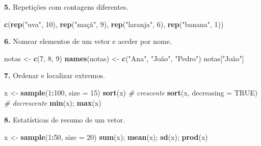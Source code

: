\documentclass[
  portuguese,
  11pt,
  openany]{book}
\newenvironment{Shaded}{\begin{snugshade}}{\end{snugshade}}
\newcommand{\AttributeTok}[1]{\textcolor[rgb]{0.13,0.29,0.53}{#1}}
\newcommand{\CommentTok}[1]{\textcolor[rgb]{0.56,0.35,0.01}{\textit{#1}}}
\newcommand{\ConstantTok}[1]{\textcolor[rgb]{0.56,0.35,0.01}{#1}}
\newcommand{\DecValTok}[1]{\textcolor[rgb]{0.00,0.00,0.81}{#1}}
\newcommand{\FunctionTok}[1]{\textcolor[rgb]{0.13,0.29,0.53}{\textbf{#1}}}
\newcommand{\NormalTok}[1]{#1}
\newcommand{\OtherTok}[1]{\textcolor[rgb]{0.56,0.35,0.01}{#1}}
\newcommand{\SpecialCharTok}[1]{\textcolor[rgb]{0.81,0.36,0.00}{\textbf{#1}}}
\newcommand{\StringTok}[1]{\textcolor[rgb]{0.31,0.60,0.02}{#1}}
\begin{document}
\textbf{5.} Repetições com contagens diferentes.

\begin{Shaded}
\begin{Highlighting}[]
\FunctionTok{c}\NormalTok{(}\FunctionTok{rep}\NormalTok{(}\StringTok{"uva"}\NormalTok{, }\DecValTok{10}\NormalTok{), }\FunctionTok{rep}\NormalTok{(}\StringTok{"maçã"}\NormalTok{, }\DecValTok{9}\NormalTok{), }\FunctionTok{rep}\NormalTok{(}\StringTok{"laranja"}\NormalTok{, }\DecValTok{6}\NormalTok{), }\FunctionTok{rep}\NormalTok{(}\StringTok{"banana"}\NormalTok{, }\DecValTok{1}\NormalTok{))}
\end{Highlighting}
\end{Shaded}

\textbf{6.} Nomear elementos de um vetor e aceder por nome.

\begin{Shaded}
\begin{Highlighting}[]
\NormalTok{notas }\OtherTok{\textless{}{-}} \FunctionTok{c}\NormalTok{(}\DecValTok{7}\NormalTok{, }\DecValTok{8}\NormalTok{, }\DecValTok{9}\NormalTok{)}
\FunctionTok{names}\NormalTok{(notas) }\OtherTok{\textless{}{-}} \FunctionTok{c}\NormalTok{(}\StringTok{"Ana"}\NormalTok{, }\StringTok{"João"}\NormalTok{, }\StringTok{"Pedro"}\NormalTok{)}
\NormalTok{notas[}\StringTok{"João"}\NormalTok{]}
\end{Highlighting}
\end{Shaded}

\textbf{7.} Ordenar e localizar extremos.

\begin{Shaded}
\begin{Highlighting}[]
\NormalTok{x }\OtherTok{\textless{}{-}} \FunctionTok{sample}\NormalTok{(}\DecValTok{1}\SpecialCharTok{:}\DecValTok{100}\NormalTok{, }\AttributeTok{size =} \DecValTok{15}\NormalTok{)}
\FunctionTok{sort}\NormalTok{(x)                    }\CommentTok{\# crescente}
\FunctionTok{sort}\NormalTok{(x, }\AttributeTok{decreasing =} \ConstantTok{TRUE}\NormalTok{) }\CommentTok{\# decrescente}
\FunctionTok{min}\NormalTok{(x); }\FunctionTok{max}\NormalTok{(x)}
\end{Highlighting}
\end{Shaded}

\textbf{8.} Estatísticas de resumo de um vetor.

\begin{Shaded}
\begin{Highlighting}[]
\NormalTok{x }\OtherTok{\textless{}{-}} \FunctionTok{sample}\NormalTok{(}\DecValTok{1}\SpecialCharTok{:}\DecValTok{50}\NormalTok{, }\AttributeTok{size =} \DecValTok{20}\NormalTok{)}
\FunctionTok{sum}\NormalTok{(x); }\FunctionTok{mean}\NormalTok{(x); }\FunctionTok{sd}\NormalTok{(x); }\FunctionTok{prod}\NormalTok{(x)}
\end{Highlighting}
\end{Shaded}
\end{document}
